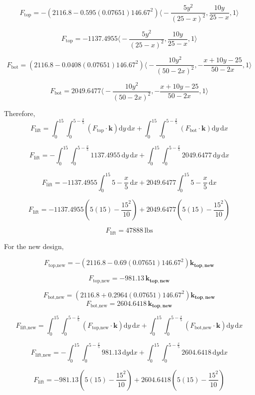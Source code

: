 \documentclass[12pt]{article}
\begin{document}
\[F_\text{top} = -(2116.8 - 0.595(0.07651)146.67^2)\Bigg\langle -\frac{5y^2}{(25 - x)^2}, \frac{10y}{25 - x}, 1 \Bigg\rangle\]

\[F_\text{top} = -1137.4955\Bigg\langle -\frac{5y^2}{(25 - x)^2}, \frac{10y}{25 - x}, 1 \Bigg\rangle\]

\[F_\text{bot} = (2116.8 - 0.0408(0.07651)146.67^2)\Bigg\langle -\frac{10y^2}{(50 - 2x)^2}, -\frac{x + 10y - 25}{50 - 2x}, 1 \Bigg\rangle \]

\[F_\text{bot} = 2049.6477\Bigg\langle -\frac{10y^2}{(50 - 2x)^2}, -\frac{x + 10y - 25}{50 - 2x}, 1 \Bigg\rangle \]

Therefore, 
\[F_\text{lift} = \int_0^{15} \int_0^{5 - \frac{x}{5}} (F_\text{top} \cdot \mathbf{k}) \mathrm{d}y \, \mathrm{d}x + \int_0^{15} \int_0^{5 - \frac{x}{5}} (F_\text{bot} \cdot \mathbf{k}) \mathrm{d}y \, \mathrm{d}x  \]

\[F_\text{lift} = -\int_0^{15} \int_0^{5 - \frac{x}{5}} 1137.4955 \, \mathrm{d}y \, \mathrm{d}x + \int_0^{15} \int_0^{5 - \frac{x}{5}} 2049.6477 \, \mathrm{d}y \, \mathrm{d}x\]

\[F_\text{lift} = -1137.4955\int_0^{15} 5 - \frac{x}{5} \, \mathrm{d}x + 2049.6477\int_0^{15} 5 - \frac{x}{5} \, \mathrm{d}x\]

\[F_\text{lift} = -1137.4955\left( 5(15) - \frac{15^2}{10}
\right)+ 2049.6477\left( 5(15) - \frac{15^2}{10}\right)\]

\[ F_\text{lift} = 47888 \, \text{lbs}\]

For the new design, 

\[ F_{\text{top,new}} = -(2116.8 - 0.69(0.07651)146.67^2)\mathbf{k_{top,new}}\]

\[F_{\text{top,new}} = -981.13 \, \mathbf{k_{top,new}} \]

\[ F_{\text{bot,new}} = (2116.8 + 0.2964(0.07651)146.67^2)\mathbf{k_{top,new}}  \]
\[ F_{\text{bot,new}} = 2604.6418 \, \mathbf{k_{top,new}}\]

\[ F_{\text{lift,new}} = \int_0^{15} \int_0^{5 - \frac{x}{5}} (F_\text{top,new} \cdot \mathbf{k}) \mathrm{d}y \, \mathrm{d}x + \int_0^{15} \int_0^{5 - \frac{x}{5}} (F_\text{bot,new} \cdot \mathbf{k}) \mathrm{d}y \, \mathrm{d}x  \] 

\[ F_{\text{lift,new}} = -\int_0^{15} \int_0^{5 - \frac{x}{5}} 981.13 \, \mathrm{d}y \mathrm{d}x + \int_0^{15} \int_0^{5 - \frac{x}{5}} 2604.6418 \,  \mathrm{d}y \mathrm{d}x \]

\[F_\text{lift} = -981.13\left( 5(15) - \frac{15^2}{10}
\right)+ 2604.6418\left( 5(15) - \frac{15^2}{10}\right)\]
\end{document}
